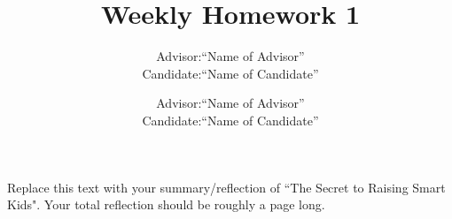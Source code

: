 \documentclass[12pt]{article}
\begin{document}
\title{Weekly Homework 1}
\author{%
 \begin{tabular}{rl}
  Advisor:  &  ``Name of Advisor'' \tabularnewline
  Candidate: & ``Name of Candidate''
\end{tabular}
\and
 \begin{tabular}{rl}
  Advisor:  &  ``Name of Advisor'' \tabularnewline
  Candidate: & ``Name of Candidate''
\end{tabular}

}

\maketitle

Replace this text with your summary/reflection of ``The Secret to Raising Smart Kids".  Your total reflection should be roughly a page long.
 
 
\end{document}

